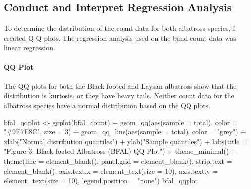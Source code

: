 \documentclass[
]{article}
\newenvironment{Shaded}{\begin{snugshade}}{\end{snugshade}}
\newcommand{\AttributeTok}[1]{\textcolor[rgb]{0.77,0.63,0.00}{#1}}
\newcommand{\DecValTok}[1]{\textcolor[rgb]{0.00,0.00,0.81}{#1}}
\newcommand{\FunctionTok}[1]{\textcolor[rgb]{0.00,0.00,0.00}{#1}}
\newcommand{\NormalTok}[1]{#1}
\newcommand{\OtherTok}[1]{\textcolor[rgb]{0.56,0.35,0.01}{#1}}
\newcommand{\SpecialCharTok}[1]{\textcolor[rgb]{0.00,0.00,0.00}{#1}}
\newcommand{\StringTok}[1]{\textcolor[rgb]{0.31,0.60,0.02}{#1}}
\begin{document}
\hypertarget{conduct-and-interpret-regression-analysis}{%
\subsection{Conduct and Interpret Regression
Analysis}\label{conduct-and-interpret-regression-analysis}}

To determine the distribution of the count data for both albatross
species, I created Q-Q plots. The regression analysis used on the band
count data was linear regression.

\hypertarget{qq-plot}{%
\paragraph{QQ Plot}\label{qq-plot}}

The QQ plots for both the Black-footed and Laysan albatross show that
the distribution is kurtosis, or they have heavy tails. Neither count
data for the albatross species have a normal distribution based on the
QQ plots.

\begin{Shaded}
\begin{Highlighting}[]
\NormalTok{bfal\_qqplot }\OtherTok{\textless{}{-}} \FunctionTok{ggplot}\NormalTok{(bfal\_count) }\SpecialCharTok{+}
  \FunctionTok{geom\_qq}\NormalTok{(}\FunctionTok{aes}\NormalTok{(}\AttributeTok{sample =}\NormalTok{ total),}
          \AttributeTok{color =} \StringTok{"\#9E7E8C"}\NormalTok{,}
          \AttributeTok{size =} \DecValTok{3}\NormalTok{) }\SpecialCharTok{+}
  \FunctionTok{geom\_qq\_line}\NormalTok{(}\FunctionTok{aes}\NormalTok{(}\AttributeTok{sample =}\NormalTok{ total),}
            \AttributeTok{color =} \StringTok{"grey"}\NormalTok{) }\SpecialCharTok{+}
  \FunctionTok{xlab}\NormalTok{(}\StringTok{"Normal distribution quantiles"}\NormalTok{) }\SpecialCharTok{+}
  \FunctionTok{ylab}\NormalTok{(}\StringTok{"Sample quantiles"}\NormalTok{) }\SpecialCharTok{+}
  \FunctionTok{labs}\NormalTok{(}\AttributeTok{title =} \StringTok{"Figure 3: Black{-}footed Albatross (BFAL) QQ Plot"}\NormalTok{) }\SpecialCharTok{+}
  \FunctionTok{theme\_minimal}\NormalTok{() }\SpecialCharTok{+}
  \FunctionTok{theme}\NormalTok{(}\AttributeTok{line =} \FunctionTok{element\_blank}\NormalTok{(),}
        \AttributeTok{panel.grid =} \FunctionTok{element\_blank}\NormalTok{(),}
        \AttributeTok{strip.text =} \FunctionTok{element\_blank}\NormalTok{(),}
        \AttributeTok{axis.text.x =} \FunctionTok{element\_text}\NormalTok{(}\AttributeTok{size =} \DecValTok{10}\NormalTok{),}
        \AttributeTok{axis.text.y =} \FunctionTok{element\_text}\NormalTok{(}\AttributeTok{size =} \DecValTok{10}\NormalTok{),}
        \AttributeTok{legend.position =} \StringTok{"none"}\NormalTok{)}
\NormalTok{bfal\_qqplot }
\end{Highlighting}
\end{Shaded}
\end{document}
